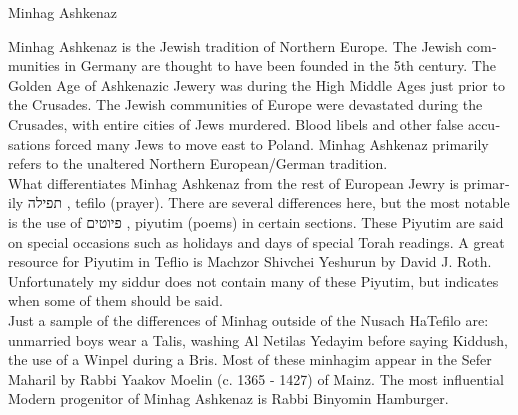 \documentclass[twoside, openany, parskip=half, 11pt]{book}
\begin{document}
\begin{minipage}{\textwidth}
\begin{english}
\begin{center}
\begin{Large}
Minhag Ashkenaz
\end{Large}
\end{center}

Minhag Ashkenaz is the Jewish tradition of Northern Europe. The Jewish communities in Germany are thought to have been founded in the 5th century. The Golden Age of Ashkenazic Jewery was during the High Middle Ages just prior to the Crusades. The Jewish communities of Europe were devastated during the Crusades, with entire cities of Jews murdered. Blood libels and other false accusations forced many Jews to move east to Poland. Minhag Ashkenaz primarily refers to the unaltered Northern European/German tradition.\\

What differentiates Minhag Ashkenaz from the rest of European Jewry is primarily תפילה , tefilo (prayer). There are several differences here, but the most notable is the use of פיוטים , piyutim (poems) in certain sections. These Piyutim are said on special occasions such as holidays and days of special Torah readings. A great resource for Piyutim in Teflio is Machzor Shivchei Yeshurun by David J. Roth. Unfortunately my siddur does not contain many of these Piyutim, but indicates when some of them should be said.\\

Just a sample of the differences of Minhag outside of the Nusach HaTefilo are: unmarried boys wear a Talis, washing Al Netilas Yedayim before saying Kiddush, the use of a Winpel during a Bris. Most of these minhagim appear in the Sefer Maharil by Rabbi Yaakov Moelin (c. 1365 - 1427) of Mainz. The most influential Modern progenitor of Minhag Ashkenaz is Rabbi Binyomin Hamburger.

\end{english}
\end{minipage}

\clearpage
\end{document}
